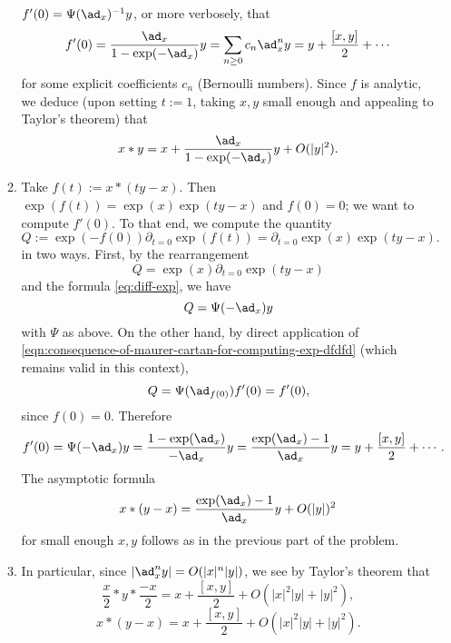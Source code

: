 \documentclass[reqno]{amsart} 
\begin{document}
\begin{itemize}
\begin{enumerate}
    $f'(0) = \Psi(\ad_x)^{-1} y$,
    or more verbosely, that
    \begin{equation}
      f'(0)
      =
      \frac{\ad_x}{1 - \exp(-\ad_x)}
      y
      =
      \sum_{n \geq 0}
      c_n \ad_x^n y
      =
      y + \frac{[x,y]}{2} + \dotsb
    \end{equation}
    for some explicit coefficients $c_n$ (Bernoulli numbers).
    Since $f$ is analytic,
    we deduce (upon setting $t := 1$,
    taking $x,y$ small enough and appealing to Taylor's theorem)
    that
    \begin{equation}
      x \ast y
      = x
      + \frac{\ad_x}{1 - \exp(-\ad_x)} y + O(|y|^2).
    \end{equation}
  \item Take $f(t) := x \ast (t y  - x)$.
    Then
    $\exp(f(t)) = \exp(x) \exp(t y - x)$ and $f(0) = 0$;
    we want to compute $f'(0)$.
    To that end, we compute the quantity
    \begin{equation}
      Q := \exp(-f(0)) \partial_{t=0} \exp(f(t))
      =
      \partial_{t=0}
      \exp(x) \exp(t y - x).
    \end{equation}
    in two ways.
    First,
    by the rearrangement
    \begin{equation}
      Q =
      \exp(x)
      \partial_{t=0}
      \exp(t y - x)
    \end{equation}
    and the formula \eqref{eq:diff-exp},
    we have
    \begin{equation}
      Q 
      = \Psi(-\ad_x) y
    \end{equation}
    with $\Psi$ as above.
    On the other hand,
    by direct application of
    \eqref{eqn:consequence-of-maurer-cartan-for-computing-exp-dfdfd}
    (which remains valid in this context),
    \begin{equation}
      Q = \Psi(\ad_{f(0)}) f'(0) = f'(0),
    \end{equation}
    since $f(0) = 0$.
    Therefore
    \begin{equation}
      f'(0) = \Psi(-\ad_x) y
      =
      \frac{1 - \exp(\ad_x)}{- \ad_x} y
      =
      \frac{\exp(\ad_x)-1}{\ad_x} y
      = y + \frac{[x,y]}{2} + \dotsb.
    \end{equation}
    The asymptotic formula
    \begin{equation}
      x \ast (y- x)
      = \frac{\exp(\ad_x) - 1}{\ad_x} y + O(|y|)^2
    \end{equation}
    for small enough $x,y$
    follows as in the previous part of the problem.
  \item
    In particular,
    since $|\ad_x^n y| = O(|x|^n |y|)$,
    we see by Taylor's theorem that
    \begin{equation}
      \frac{x}{2} \ast y
      \ast \frac{-x}{2}
      = x + \frac{[x,y]}{2} + O(|x|^2 |y| + |y|^2),
    \end{equation}
    \begin{equation}
      x \ast (y - x)
      = x + \frac{[x,y]}{2} + O(|x|^2 |y| + |y|^2).
    \end{equation}
  \end{enumerate}
\end{itemize}
\end{document}
